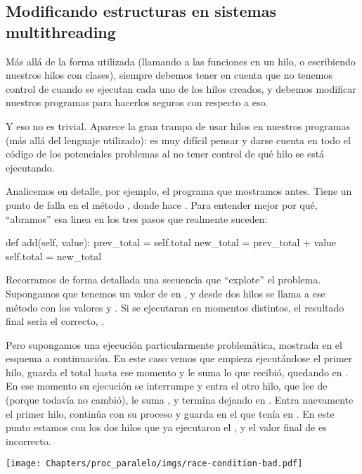\subsection{Modificando estructuras en sistemas multithreading}

Más allá de la forma utilizada (llamando a las funciones en un hilo, o escribiendo nuestros hilos con clases), siempre debemos tener en cuenta que no tenemos control de cuando se ejecutan cada uno de los hilos creados, y debemos modificar nuestros programas para hacerlos seguros con respecto a eso.

Y eso no es trivial. Aparece la gran trampa de usar hilos en nuestros programas (más allá del lenguaje utilizado): es muy difícil pensar y darse cuenta en todo el código de los potenciales problemas al no tener control de qué hilo se está ejecutando.

Analicemos en detalle, por ejemplo, el programa que mostramos antes. Tiene un punto de falla en el método , donde hace . Para entender mejor por qué, ``abramos'' esa linea en los tres pasos que realmente suceden:

\begin{py}
def add(self, value):
    prev_total = self.total
    new_total = prev_total + value
    self.total = new_total
\end{py}

Recorramos de forma detallada una secuencia que ``explote'' el problema. Supongamos que tenemos un valor de  en , y desde dos hilos se llama a ese método con los valores  y . Si se ejecutaran en momentos distintos, el resultado final sería el correcto, . 

Pero supongamos una ejecución particularmente problemática, mostrada en el esquema a continuación. En este caso vemos que empieza ejecutándose el primer hilo, guarda el total hasta ese momento y le suma lo que recibió, quedando  en . En ese momento su ejecución se interrumpe y entra el otro hilo, que lee  de  (porque todavía no cambió), le suma , y termina dejando  en . Entra nuevamente el primer hilo, continúa con su proceso y guarda en  el  que tenía en . En este punto estamos con los dos hilos que ya ejecutaron el , y el valor final de  es incorrecto.

\begin{center}
    \texttt{[image: Chapters/proc\_paralelo/imgs/race-condition-bad.pdf]}
\end{center}
    
